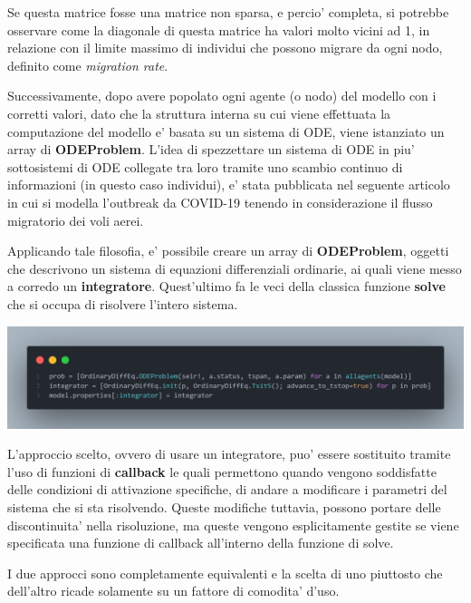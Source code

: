 Se questa matrice fosse una matrice non sparsa, e percio' completa, si potrebbe osservare
come la diagonale di questa matrice ha valori molto vicini ad 1, in relazione con il limite
massimo di individui che possono migrare da ogni nodo, definito come \emph{migration rate}.

Successivamente, dopo avere popolato ogni agente (o nodo) del modello con i corretti valori,
dato che la struttura interna su cui viene effettuata la computazione del modello e' basata su 
un sistema di ODE, viene istanziato un array di \textbf{ODEProblem}. L'idea di spezzettare
un sistema di ODE in piu' sottosistemi di ODE collegate tra loro tramite uno scambio continuo 
di informazioni (in questo caso individui), e' stata pubblicata nel seguente articolo \cite{Ding2021}
in cui si modella l'outbreak da COVID-19 tenendo in considerazione il flusso migratorio 
dei voli aerei. 

Applicando tale filosofia, e' possibile creare un array di \textbf{ODEProblem}, oggetti che descrivono
un sistema di equazioni differenziali ordinarie, ai quali viene messo a corredo un \textbf{integratore}. 
Quest'ultimo fa le veci della classica funzione \textbf{solve} che si occupa di risolvere l'intero sistema.

\begin{minipage}{\linewidth}
	\centering
	\includegraphics[width=\textwidth]{img/model_ode.png}
	\label{fig:model_ode}
\end{minipage}

L'approccio scelto, ovvero di usare un integratore, puo' essere sostituito tramite
l'uso di funzioni di \textbf{callback} le quali permettono quando vengono soddisfatte delle
condizioni di attivazione specifiche, di andare a modificare i parametri del sistema che
si sta risolvendo. Queste modifiche tuttavia, possono portare delle discontinuita' nella 
risoluzione, ma queste vengono esplicitamente gestite se viene specificata una funzione 
di callback all'interno della funzione di solve. 

I due approcci sono completamente equivalenti e la scelta di uno piuttosto che dell'altro
ricade solamente su un fattore di comodita' d'uso.

